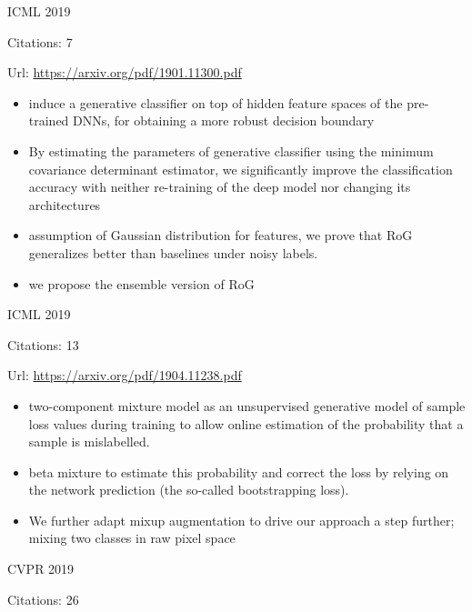 \documentclass[11pt]{article}
\begin{document}
\vspace{2cm}

\noindent ICML 2019

\noindent Citations: 7

\noindent Url: \url{https://arxiv.org/pdf/1901.11300.pdf}

\begin{itemize}
  \item induce a generative classifier on top of hidden feature spaces of the pre-trained DNNs, for obtaining a more robust decision boundary
  \item By estimating the parameters of generative classifier using the minimum covariance determinant estimator, we significantly improve the classification accuracy with neither re-training of the deep model nor changing its architectures
  \item assumption of Gaussian distribution for features, we prove that RoG generalizes better than baselines under noisy labels.
  \item we propose the ensemble version of RoG
\end{itemize}


\vspace{2cm}

\noindent ICML 2019

\noindent Citations: 13

\noindent Url: \url{https://arxiv.org/pdf/1904.11238.pdf}

\begin{itemize}
  \item two-component mixture model as an unsupervised generative model of sample loss values during training to allow online estimation of the probability that a sample is mislabelled. 
  \item beta mixture to estimate this probability and correct the loss by relying on the network prediction (the so-called bootstrapping loss).
  \item We further adapt mixup augmentation to drive our approach a step further; mixing two classes in raw pixel space
\end{itemize}

\vspace{2cm}

\noindent CVPR 2019

\noindent Citations: 26
\end{document}
